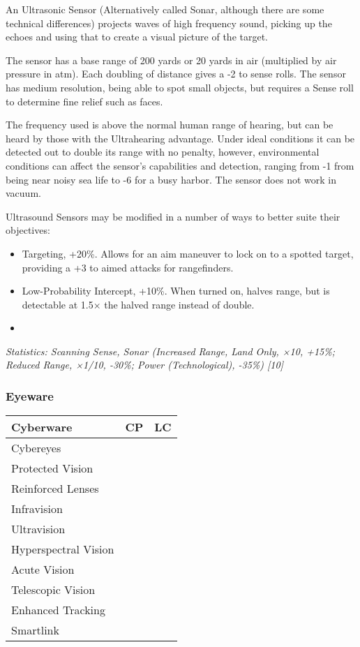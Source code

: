 \begin{multicols*}{3}
	An Ultrasonic Sensor (Alternatively called Sonar, although there are some technical differences) projects waves of high frequency sound, picking up the echoes and using that to create a visual picture of the target.
	
	The sensor has a base range of 200 yards or 20 yards in air (multiplied by air pressure in atm). Each doubling of distance gives a -2 to sense rolls. The sensor has medium resolution, being able to spot small objects, but requires a Sense roll to determine fine relief such as faces.
	
	The frequency used is above the normal human range of hearing, but can be heard by those with the Ultrahearing advantage. Under ideal conditions it can be detected out to double its range with no penalty, however, environmental conditions can affect the sensor's capabilities and detection, ranging from -1 from being near noisy sea life to -6 for a busy harbor. The sensor does not work in vacuum.
	
	Ultrasound Sensors may be modified in a number of ways to better suite their objectives:
	\begin{itemize}
		\item Targeting, +20\%. Allows for an aim maneuver to lock on to a spotted target, providing a +3 to aimed attacks for rangefinders.
		\item Low-Probability Intercept, +10\%. When turned on, halves range, but is detectable at 1.5× the halved range instead of double.
		\item 
	\end{itemize}
	
	\textit{\textcolor{OliveGreen}{Statistics: Scanning Sense, Sonar (Increased Range, Land Only, ×10, +15\%; Reduced Range, ×1/10, -30\%; Power (Technological), -35\%) [10]}}
	
	\subsubsection{Eyeware}
	
	\begin{center}
		\begin{tabularx}{0.32\textwidth}{|X|c|c|}
			\hline
			Cyberware & CP & LC\\
			\hline
			\hline
			Cybereyes & & \\
			\hline
			Protected Vision & & \\
			Reinforced Lenses & & \\
			Infravision & & \\
			Ultravision & & \\
			Hyperspectral Vision & & \\
			Acute Vision & & \\
			Telescopic Vision & & \\
			Enhanced Tracking & & \\
			Smartlink & & \\
			\hline
		\end{tabularx}
	\end{center}
	

\end{multicols*}
